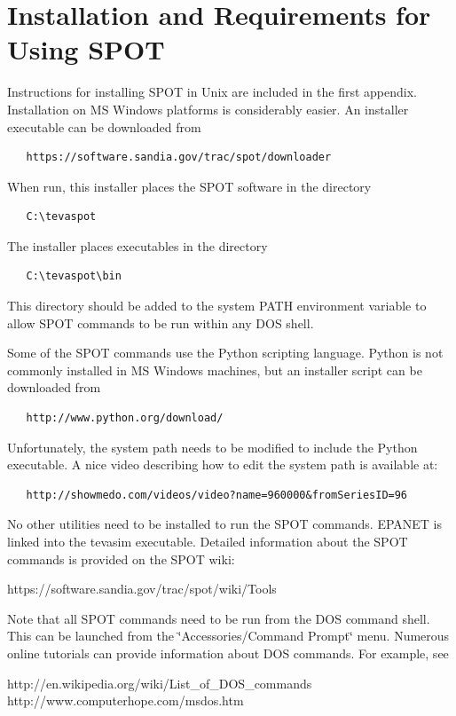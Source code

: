 \section{Installation and Requirements for Using SPOT}\label{example_gStarted5}

Instructions for installing SPOT in Unix are included in the first appendix. Installation on MS Windows platforms is considerably easier. An installer executable can be downloaded from \begin{verbatim}
   https://software.sandia.gov/trac/spot/downloader
\end{verbatim}
 When run, this installer places the SPOT software in the directory
\begin{verbatim}
   C:\tevaspot
\end{verbatim}
 The installer places executables in the directory
\begin{verbatim}
   C:\tevaspot\bin
\end{verbatim}
 This directory should be added to the system PATH environment variable to allow SPOT commands to be run within any DOS shell.

Some of the SPOT commands use the Python scripting language. Python is not commonly installed in MS Windows machines, but an installer script can be downloaded from
\begin{verbatim}
   http://www.python.org/download/
\end{verbatim}
 Unfortunately, the system path needs to be modified to include the Python executable. A nice video describing how to edit the system path is available at:
\begin{verbatim}
   http://showmedo.com/videos/video?name=960000&fromSeriesID=96
\end{verbatim}


No other utilities need to be installed to run the SPOT commands. EPANET is linked into the {\ttfamily tevasim} executable. Detailed information about the SPOT commands is provided on the SPOT wiki: \begin{verb}
   https://software.sandia.gov/trac/spot/wiki/Tools
\end{verb}


Note that all SPOT commands need to be run from the DOS command shell. This can be launched from the \char`\"{}Accessories/Command Prompt\char`\"{} menu. Numerous online tutorials can provide information about DOS commands. For example, see \begin{verb}
  http://en.wikipedia.org/wiki/List_of_DOS_commands
  http://www.computerhope.com/msdos.htm
\end{verb}


